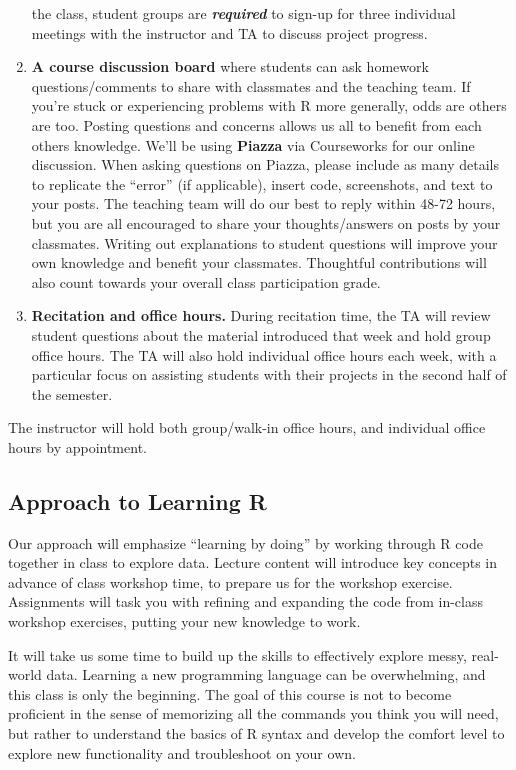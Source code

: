 \documentclass[11pt,]{article}
\begin{document}
\begin{enumerate}
  the class, student groups are \emph{\textbf{required}} to sign-up for
  three individual meetings with the instructor and TA to discuss
  project progress.
\item
  \textbf{A course discussion board} where students can ask homework
  questions/comments to share with classmates and the teaching team. If
  you're stuck or experiencing problems with R more generally, odds are
  others are too. Posting questions and concerns allows us all to
  benefit from each others knowledge. We'll be using \textbf{Piazza} via
  Courseworks for our online discussion. When asking questions on
  Piazza, please include as many details to replicate the ``error'' (if
  applicable), insert code, screenshots, and text to your posts. The
  teaching team will do our best to reply within 48-72 hours, but you
  are all encouraged to share your thoughts/answers on posts by your
  classmates. Writing out explanations to student questions will improve
  your own knowledge and benefit your classmates. Thoughtful
  contributions will also count towards your overall class participation
  grade.
\item
  \textbf{Recitation and office hours.} During recitation time, the TA
  will review student questions about the material introduced that week
  and hold group office hours. The TA will also hold individual office
  hours each week, with a particular focus on assisting students with
  their projects in the second half of the semester.
\end{enumerate}

The instructor will hold both group/walk-in office hours, and individual
office hours by appointment.

\hypertarget{approach-to-learning-r}{%
\subsection{Approach to Learning R}\label{approach-to-learning-r}}

Our approach will emphasize ``learning by doing'' by working through R
code together in class to explore data. Lecture content will introduce
key concepts in advance of class workshop time, to prepare us for the
workshop exercise. Assignments will task you with refining and expanding
the code from in-class workshop exercises, putting your new knowledge to
work.

It will take us some time to build up the skills to effectively explore
messy, real-world data. Learning a new programming language can be
overwhelming, and this class is only the beginning. The goal of this
course is not to become proficient in the sense of memorizing all the
commands you think you will need, but rather to understand the basics of
R syntax and develop the comfort level to explore new functionality and
troubleshoot on your own.
\end{document}
